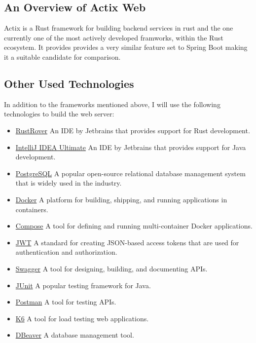 \documentclass[a4paper,12pt]{article}
\begin{document}
	\subsection{An Overview of Actix Web}
	\label{subsec:actix_web}
	Actix is a Rust framework for building backend services in rust and the one currently one of the most actively developed framworks,
	within the Rust ecosystem. It provides provides a very similar feature set to Spring Boot making it a suitable candidate for comparison.

	\newpage
	\subsection{Other Used Technologies}
	\label{subsec:used_technologies}
	In addition to the frameworks mentioned above, I will use the following technologies to build the web server:
	\begin{itemize}
		\item \href{https://www.jetbrains.com/de-de/rust/}{RustRover} An IDE by Jetbrains that provides support for Rust development.
		\item \href{https://www.jetbrains.com/de-de/idea/}{IntelliJ IDEA Ultimate} An IDE by Jetbrains that provides support for Java development.
		\item \href{https://www.postgresql.org/}{PostgreSQL} A popular open-source relational database management system that is widely used in the industry.
		\item \href{https://www.docker.com/}{Docker} A platform for building, shipping, and running applications in containers.
		\item \href{https://docs.docker.com/compose/}{Compose} A tool for defining and running multi-container Docker applications.
		\item \href{https://jwt.io/}{JWT} A standard for creating JSON-based access tokens that are used for authentication and authorization.
		\item \href{https://swagger.io/}{Swagger}  A tool for designing, building, and documenting APIs.
		\item \href{https://junit.org/junit5/}{JUnit} A popular testing framework for Java.
		\item \href{https://www.postman.com/}{Postman} A tool for testing APIs.
		\item \href{https://k6.io/}{K6} A tool for load testing web applications.
		\item \href{https://dbeaver.io/}{DBeaver} A database management tool.
	\end{itemize}
\end{document}
